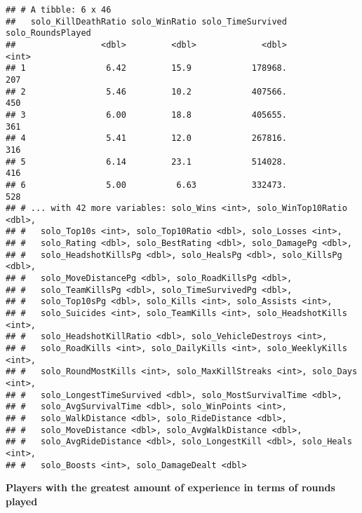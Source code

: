 \documentclass[]{article}
\begin{document}
\begin{verbatim}
## # A tibble: 6 x 46
##   solo_KillDeathRatio solo_WinRatio solo_TimeSurvived solo_RoundsPlayed
##                 <dbl>         <dbl>             <dbl>             <int>
## 1                6.42         15.9            178968.               207
## 2                5.46         10.2            407566.               450
## 3                6.00         18.8            405655.               361
## 4                5.41         12.0            267816.               316
## 5                6.14         23.1            514028.               416
## 6                5.00          6.63           332473.               528
## # ... with 42 more variables: solo_Wins <int>, solo_WinTop10Ratio <dbl>,
## #   solo_Top10s <int>, solo_Top10Ratio <dbl>, solo_Losses <int>,
## #   solo_Rating <dbl>, solo_BestRating <dbl>, solo_DamagePg <dbl>,
## #   solo_HeadshotKillsPg <dbl>, solo_HealsPg <dbl>, solo_KillsPg <dbl>,
## #   solo_MoveDistancePg <dbl>, solo_RoadKillsPg <dbl>,
## #   solo_TeamKillsPg <dbl>, solo_TimeSurvivedPg <dbl>,
## #   solo_Top10sPg <dbl>, solo_Kills <int>, solo_Assists <int>,
## #   solo_Suicides <int>, solo_TeamKills <int>, solo_HeadshotKills <int>,
## #   solo_HeadshotKillRatio <dbl>, solo_VehicleDestroys <int>,
## #   solo_RoadKills <int>, solo_DailyKills <int>, solo_WeeklyKills <int>,
## #   solo_RoundMostKills <int>, solo_MaxKillStreaks <int>, solo_Days <int>,
## #   solo_LongestTimeSurvived <dbl>, solo_MostSurvivalTime <dbl>,
## #   solo_AvgSurvivalTime <dbl>, solo_WinPoints <int>,
## #   solo_WalkDistance <dbl>, solo_RideDistance <dbl>,
## #   solo_MoveDistance <dbl>, solo_AvgWalkDistance <dbl>,
## #   solo_AvgRideDistance <dbl>, solo_LongestKill <dbl>, solo_Heals <int>,
## #   solo_Boosts <int>, solo_DamageDealt <dbl>
\end{verbatim}

\textbf{Players with the greatest amount of experience in terms of
rounds played}
\end{document}
